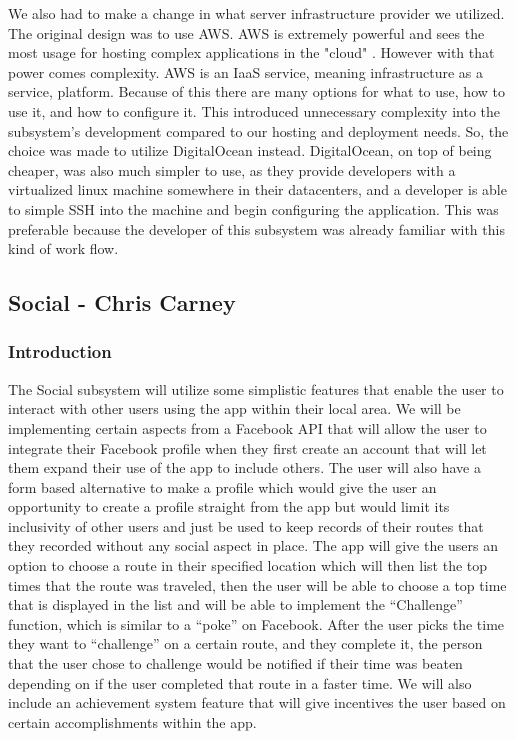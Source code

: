 \documentclass{article}
\begin{document}
We also had to make a change in what server infrastructure provider we utilized. The original design was to
use AWS. AWS is extremely powerful and sees the most usage for hosting complex applications in the "cloud"
\cite{aws_do}. However with that power comes complexity. AWS is an IaaS service, meaning infrastructure as a
service, platform. Because of this there are many options for what to use, how to use it, and how to
configure it. This introduced unnecessary complexity into the subsystem's development compared to our
hosting and deployment needs. So, the choice was made to utilize DigitalOcean instead. DigitalOcean, on top
of being cheaper, was also much simpler to use, as they provide developers with a virtualized linux machine
somewhere in their datacenters, and a developer is able to simple SSH into the machine and begin configuring
the application. This was preferable because the developer of this subsystem was already familiar with this
kind of work flow.


\subsection{Social - Chris Carney}
\subsubsection{Introduction}
The Social subsystem will utilize some simplistic features that enable the user to interact with other users using the app within their local area. We will be implementing certain aspects from a Facebook API that will allow the user to integrate their Facebook profile when they first create an account that will let them expand their use of the app to include others. The user will also have a form based alternative to make a profile which would give the user an opportunity to create a profile straight from the app but would limit its inclusivity of other users and just be used to keep records of their routes that they recorded without any social aspect in place.
The app will give the users an option to choose a route in their specified location which will then list the top times that the route was traveled, then the user will be able to choose a top time that is displayed in the list and will be able to implement the “Challenge” function, which is similar to a “poke” on Facebook. After the user picks the time they want to “challenge” on a certain route, and they complete it, the person that the user chose to challenge would be notified if their time was beaten depending on if the user completed that route in a faster time.
We will also include an achievement system feature that will give incentives the user based on certain accomplishments within the app.
\end{document}
